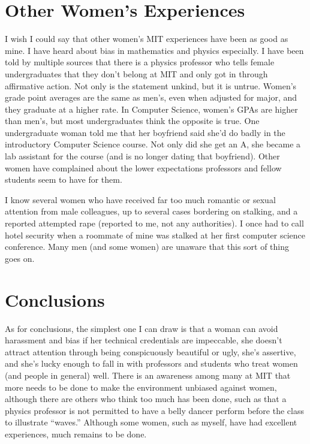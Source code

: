 \section{Other Women's Experiences}

I wish I could say that other women's MIT experiences have been as
good as mine.  I have heard about bias in mathematics and physics
especially.  I have been told by multiple sources that there is a
physics professor who tells female undergraduates that they don't
belong at MIT and only got in through affirmative action.  Not only is
the statement unkind, but it is untrue.  Women's grade point averages
are the same as men's, even when adjusted for major, and they graduate
at a higher rate.  In Computer Science, women's GPAs are higher than
men's, but most undergraduates think the opposite is true.  One
undergraduate woman told me that her boyfriend said she'd do badly in
the introductory Computer Science course.  Not only did she get an A,
she became a lab assistant for the course (and is no longer dating
that boyfriend).  Other women have complained about the lower
expectations professors and fellow students seem to have for them.

I know several women who have received far too much romantic or sexual
attention from male colleagues, up to several cases bordering on
stalking, and a reported attempted rape (reported to me, not any
authorities).  I once had to call hotel security when a roommate of
mine was stalked at her first computer science conference.  Many men
(and some women) are unaware that this sort of thing goes on.

\section{Conclusions}

As for conclusions, the simplest one I can draw is that a woman can
avoid harassment and bias if her technical credentials are impeccable,
she doesn't attract attention through being conspicuously beautiful or
ugly, she's assertive, and she's lucky enough to fall in with
professors and students who treat women (and people in general) well.
There is an awareness among many at MIT that more needs to be done to
make the environment unbiased against women, although there are others
who think too much has been done, such as that a physics professor is
not permitted to have a belly dancer perform before the class to
illustrate ``waves.''  Although some women, such as myself, have
had excellent experiences, much remains to be done.




